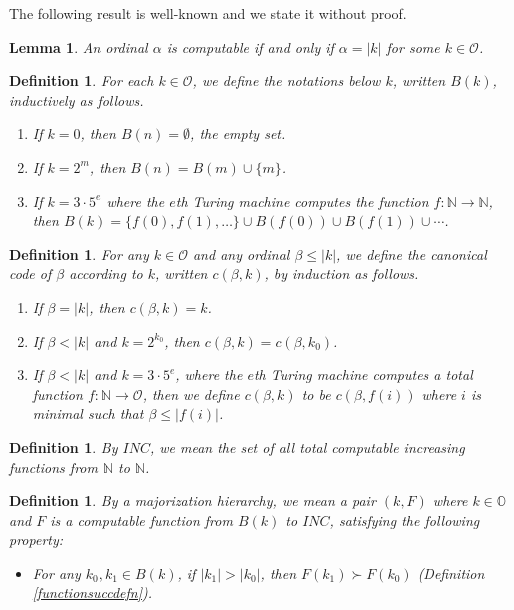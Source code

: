 \documentclass{article}
\newtheorem{definition}[theorem]{Definition}
\newtheorem{lemma}[theorem]{Lemma}
\begin{document}
The following result is well-known and we state it without proof.

\begin{lemma}
    An ordinal $\alpha$ is computable if and only if $\alpha=|k|$ for some $k\in\mathcal O$.
\end{lemma}

\begin{definition}
\label{notationsbelowkdefn}
    For each $k\in\mathcal O$, we define the \emph{notations below $k$},
    written $B(k)$, inductively as follows.
    \begin{enumerate}
        \item
        If $k=0$, then $B(n)=\emptyset$, the empty set.
        \item
        If $k=2^m$, then $B(n)=B(m)\cup\{m\}$.
        \item
        If $k=3\cdot 5^e$ where the $e$th Turing machine computes the
        function $f:\mathbb N\to\mathbb N$, then
        $B(k)=\{f(0),f(1),\ldots\} \cup B(f(0)) \cup B(f(1)) \cup \cdots$.
    \end{enumerate}
\end{definition}

\begin{definition}
    For any $k\in\mathcal O$ and any ordinal $\beta\leq |k|$, we define
    \emph{the canonical code of $\beta$ according to $k$}, written $c(\beta,k)$,
    by induction as follows.
    \begin{enumerate}
        \item
        If $\beta=|k|$, then $c(\beta,k)=k$.
        \item
        If $\beta<|k|$ and $k=2^{k_0}$, then $c(\beta,k)=c(\beta,k_0)$.
        \item
        If $\beta<|k|$ and $k=3\cdot 5^e$, where the $e$th Turing machine computes
        a total function $f:\mathbb N\to \mathcal O$, then we define
        $c(\beta,k)$ to be $c(\beta,f(i))$ where $i$ is minimal such that
        $\beta\leq |f(i)|$.
    \end{enumerate}
\end{definition}

\begin{definition}
By $INC$, we mean the set of all total computable increasing functions from
$\mathbb N$ to $\mathbb N$.
\end{definition}

\begin{definition}
    By a \emph{majorization hierarchy}, we mean a pair $(k,F)$
    where $k\in\mathbb O$ and $F$ is a computable function from $B(k)$ to $INC$,
    satisfying the following property:
    \begin{itemize}
        \item
        For any $k_0,k_1\in B(k)$, if $|k_1|>|k_0|$, then
        $F(k_1)\succ F(k_0)$ (Definition \ref{functionsuccdefn}).
    \end{itemize}
\end{definition}
\end{document}
